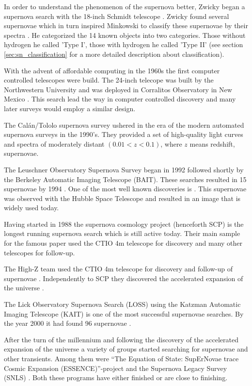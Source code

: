 In order to understand the phenomenon of the supernova better, Zwicky began a supernova search with the 18-inch Schmidt telescope . Zwicky found several supernovae which in turn inspired Minkowski to classify these supernovae by their spectra \citet{1941PASP...53..224M}. 
He categorized the 14 known objects into two categories. Those without hydrogen he called 'Type I', those with hydrogen he called 'Type II' (see section \ref{sec:sn_classification} for a more detailed description about classification).

With the advent of affordable computing in the 1960s the first computer controlled telescopes were build. The 24-inch telecope was built by the Northwestern University and was deployed in Corralitos Observatory in New Mexico \citep{1975PASP...87..565C}. This search lead the way in computer controlled discovery and many later surveys would employ a similar design.

The Cal\'{a}n/Tololo supernova survey \citep{1993AJ....106.2392H} ushered in the era of the modern automated supernova surveys in the 1990's. They provided a set of high-quality light curves and spectra of moderately distant $(0.01 < z < 0.1)$, where $z$ means redshift, supernovae.

The Leuschner Observatory Supernova Survey began in 1992 followed shortly by the Berkeley Automatic Imaging Telescope (BAIT). These searches resulted in 15 supernovae by 1994 \citep{1994AAS...185.7905V}. One of the most well known discoveries is . This supernovae was observed with the Hubble Space Telescope and resulted in an image that is widely used today.

Having started in 1988 the supernova cosmology project (henceforth SCP) is the longest running supernova search which is still active today. Their main sample for the famous paper \citep{1999ApJ...517..565P} used the CTIO 4m telescope for discovery and many other telescopes for follow-up.

The High-Z team used the CTIO 4m telescope for discovery and follow-up of supernovae \citep{1998ApJ...507...46S}. Independently to SCP they discovered the accelerated expansion of the universe \citep{1998AJ....116.1009R}.


The Lick Observatory Supernova Search (LOSS) using the Katzman Automatic Imaging Telescope (KAIT) is one of the most successful supernovae searches. By the year 2000 it had found 96 supernovae \citep{2001ASPC..246..121F}. 

After the turn of the millennium and following the discovery of the accelerated expansion of the universe a variety of groups started searching for supernovae and other transients. Among them were ``The Equation of State: SupErNovae trace Cosmic Expansion (ESSENCE)''-project \citep{2002AAS...201.7809G} and the Supernova Legacy Survey (SNLS) \citep{2003AAS...203.8209P}. Both these programs have either finished or are close to finishing. 


